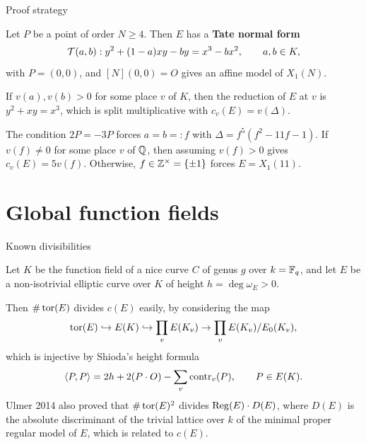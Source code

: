 \begin{frame}{Proof strategy}

Let $ P $ be a point of order $ N \ge 4 $. Then $ E $ has a \textbf{Tate normal form}
$$ \mathcal{T}(a, b) : y^2 + (1 - a)xy - by = x^3 - bx^2, \qquad a, b \in K, $$
with $ P = (0, 0) $, and $ [N](0, 0) = O $ gives an affine model of $ X_1(N) $.

\bigskip If $ v(a), v(b) > 0 $ for some place $ v $ of $ K $, then the reduction of $ E $ at $ v $ is $ y^2 + xy = x^3 $, which is split multiplicative with $ c_v(E) = v(\Delta) $.

\bigskip

\begin{example}[$ K = \Q $ and $ N = 5 $]
The condition $ 2P = -3P $ forces $ a = b =: f $ with $ \Delta = f^5(f^2 - 11f - 1) $. If $ v(f) \ne 0 $ for some place $ v $ of $ \mathbb{Q} $, then assuming $ v(f) > 0 $ gives $ c_v(E) = 5v(f) $. Otherwise, $ f \in \mathbb{Z}^\times = \{\pm1\} $ forces $ E = X_1(11) $.
\end{example}

\end{frame}

\section{Global function fields}

\begin{frame}{Known divisibilities}

Let $ K $ be the function field of a nice curve $ C $ of genus $ g $ over $ k = \mathbb{F}_q $, and let $ E $ be a non-isotrivial elliptic curve over $ K $ of height $ h = \deg\omega_E > 0 $.

\bigskip Then $ \#\operatorname{tor}(E) $ divides $ c(E) $ easily, by considering the map
$$ \operatorname{tor}(E) \hookrightarrow E(K) \hookrightarrow \prod_v E(K_v) \to \prod_v E(K_v) / E_0(K_v), $$
which is injective by Shioda's height formula
$$ \langle P, P\rangle = 2h + 2(P \cdot O) - \sum_v \operatorname{contr}_v(P), \qquad P \in E(K). $$
Ulmer 2014 also proved that $ \#\operatorname{tor}(E)^2 $ divides $ \operatorname{Reg}(E) \cdot D(E) $, where $ D(E) $ is the absolute discriminant of the trivial lattice over $ k $ of the minimal proper regular model of $ E $, which is related to $ c(E) $.

\end{frame}


